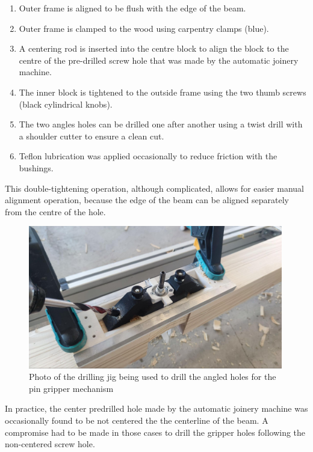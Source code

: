 \begin{enumerate}
    \item Outer frame is aligned to be flush with the edge of the beam.
    \item Outer frame is clamped to the wood using carpentry clamps (blue).
    \item A centering rod is inserted into the centre block to align the block to the centre of the pre-drilled screw hole that was made by the automatic joinery machine.
    \item The inner block is tightened to the outside frame using the two thumb screws (black cylindrical knobs).
    \item The two angles holes can be drilled one after another using a twist drill with a shoulder cutter to ensure a clean cut.
    \item Teflon lubrication was applied occasionally to reduce friction with the bushings.
\end{enumerate}

This double-tightening operation, although complicated, allows for easier manual alignment operation, because the edge of the beam can be aligned separately from the centre of the hole.

\begin{figure}[!h]
    \centering
    \includegraphics[width=0.99\textwidth]{images/7a/img48.jpg}
    \caption{Photo of the drilling jig being used to drill the angled holes for the pin gripper mechanism}
    \label{fig:pin-gripper-drill-jig}
\end{figure}

In practice, the center predrilled hole made by the automatic joinery machine was occasionally found to be not centered the the centerline of the beam. A compromise had to be made in those cases to drill the gripper holes following the non-centered screw hole.

